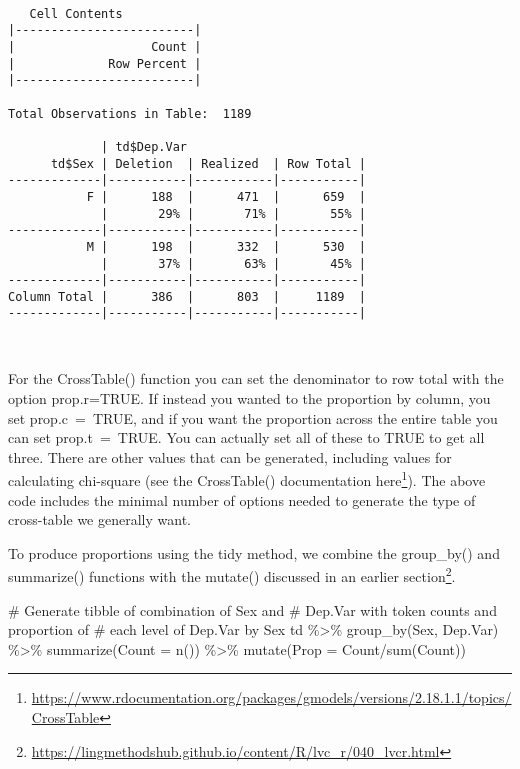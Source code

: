 \documentclass[
  12pt,
  letterpaper]{article}
\newenvironment{Shaded}{\begin{snugshade}}{\end{snugshade}}
\newcommand{\AttributeTok}[1]{\textcolor[rgb]{0.40,0.45,0.13}{#1}}
\newcommand{\CommentTok}[1]{\textcolor[rgb]{0.37,0.37,0.37}{#1}}
\newcommand{\FunctionTok}[1]{\textcolor[rgb]{0.28,0.35,0.67}{#1}}
\newcommand{\NormalTok}[1]{\textcolor[rgb]{0.00,0.23,0.31}{#1}}
\newcommand{\SpecialCharTok}[1]{\textcolor[rgb]{0.37,0.37,0.37}{#1}}
\renewcommand\texttt[1]{{\ttfamily\color{BrickRed}#1}}
\DeclareRobustCommand{\href}[2]{#2\footnote{\url{#1}}}
\begin{document}
\begin{verbatim}

   Cell Contents
|-------------------------|
|                   Count |
|             Row Percent |
|-------------------------|

Total Observations in Table:  1189 

             | td$Dep.Var 
      td$Sex | Deletion  | Realized  | Row Total | 
-------------|-----------|-----------|-----------|
           F |      188  |      471  |      659  | 
             |       29% |       71% |       55% | 
-------------|-----------|-----------|-----------|
           M |      198  |      332  |      530  | 
             |       37% |       63% |       45% | 
-------------|-----------|-----------|-----------|
Column Total |      386  |      803  |     1189  | 
-------------|-----------|-----------|-----------|

 
\end{verbatim}

For the \texttt{CrossTable()} function you can set the denominator to
row total with the option \texttt{prop.r=TRUE}. If instead you wanted to
the proportion by column, you set \texttt{prop.c\ =\ TRUE}, and if you
want the proportion across the entire table you can set
\texttt{prop.t\ =\ TRUE}. You can actually set all of these to
\texttt{TRUE} to get all three. There are other values that can be
generated, including values for calculating chi-square (see the
\texttt{CrossTable()} documentation
\href{https://www.rdocumentation.org/packages/gmodels/versions/2.18.1.1/topics/CrossTable}{here}).
The above code includes the minimal number of options needed to generate
the type of cross-table we generally want.

To produce proportions using the \texttt{tidy} method, we combine the
\texttt{group\_by()} and \texttt{summarize()} functions with the
\texttt{mutate()} discussed in an
\href{https://lingmethodshub.github.io/content/R/lvc_r/040_lvcr.html}{earlier
section}.

\begin{Shaded}
\begin{Highlighting}[]
\CommentTok{\# Generate tibble of combination of Sex and}
\CommentTok{\# Dep.Var with token counts and proportion of}
\CommentTok{\# each level of Dep.Var by Sex}
\NormalTok{td }\SpecialCharTok{\%\textgreater{}\%}
    \FunctionTok{group\_by}\NormalTok{(Sex, Dep.Var) }\SpecialCharTok{\%\textgreater{}\%}
    \FunctionTok{summarize}\NormalTok{(}\AttributeTok{Count =} \FunctionTok{n}\NormalTok{()) }\SpecialCharTok{\%\textgreater{}\%}
    \FunctionTok{mutate}\NormalTok{(}\AttributeTok{Prop =}\NormalTok{ Count}\SpecialCharTok{/}\FunctionTok{sum}\NormalTok{(Count))}
\end{Highlighting}
\end{Shaded}
\end{document}
